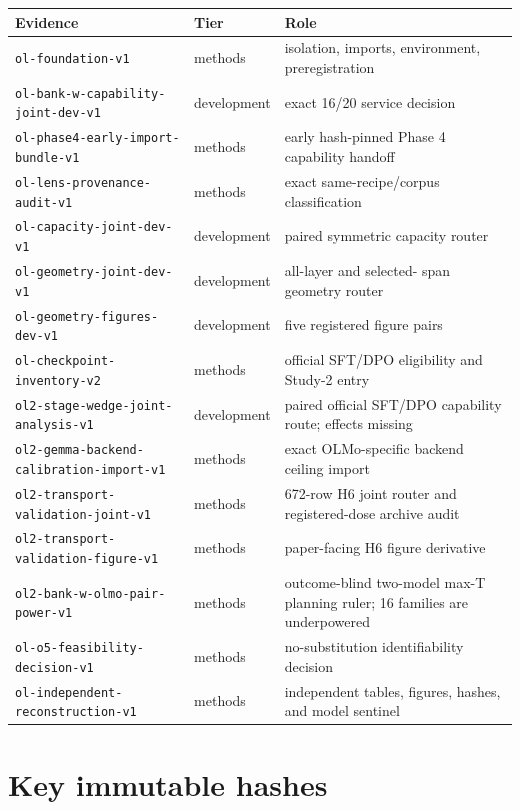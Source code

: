 \documentclass[11pt]{article}
\begin{document}
\begin{tabularx}{\textwidth}{@{}p{}p{}X@{}}
\toprule
\textbf{Evidence} & \textbf{Tier} & \textbf{Role}\\
\midrule
\nolinkurl{ol-foundation-v1} & methods & isolation, imports, environment,
preregistration\\
\nolinkurl{ol-bank-w-capability-joint-dev-v1} & development & exact 16/20
service decision\\
\nolinkurl{ol-phase4-early-import-bundle-v1} & methods & early hash-pinned
Phase 4 capability handoff\\
\nolinkurl{ol-lens-provenance-audit-v1} & methods & exact same-recipe/corpus
classification\\
\nolinkurl{ol-capacity-joint-dev-v1} & development & paired symmetric capacity
router\\
\nolinkurl{ol-geometry-joint-dev-v1} & development & all-layer and selected-
span geometry router\\
\nolinkurl{ol-geometry-figures-dev-v1} & development & five registered figure
pairs\\
\nolinkurl{ol-checkpoint-inventory-v2} & methods & official SFT/DPO eligibility
and Study-2 entry\\
\nolinkurl{ol2-stage-wedge-joint-analysis-v1} & development & paired official
SFT/DPO capability route; effects missing\\
\nolinkurl{ol2-gemma-backend-calibration-import-v1} & methods & exact
OLMo-specific backend ceiling import\\
\nolinkurl{ol2-transport-validation-joint-v1} & methods & 672-row H6 joint
router and registered-dose archive audit\\
\nolinkurl{ol2-transport-validation-figure-v1} & methods & paper-facing H6
figure derivative\\
\nolinkurl{ol2-bank-w-olmo-pair-power-v1} & methods & outcome-blind two-model
max-T planning ruler; 16 families are underpowered\\
\nolinkurl{ol-o5-feasibility-decision-v1} & methods & no-substitution
identifiability decision\\
\nolinkurl{ol-independent-reconstruction-v1} & methods & independent tables,
figures, hashes, and model sentinel\\
\bottomrule
\end{tabularx}

\section{Key immutable hashes}
\end{document}

